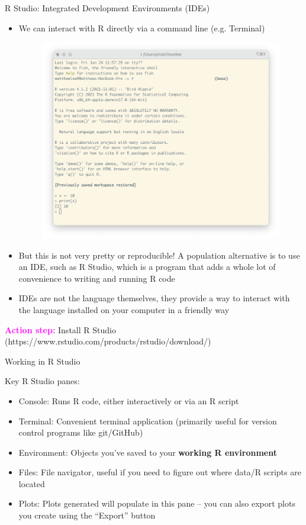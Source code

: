 \documentclass[svgnames,smaller]{beamer}\usepackage[]{graphicx}\usepackage[]{color}
\newcommand{\bmagenta}[1]{\textcolor{magenta}{\textbf{#1}}}
\begin{document}
\begin{frame}{R Studio: Integrated Development Environments (IDEs)}

\begin{itemize}
    \item We can interact with R directly via a command line (e.g. Terminal)
    \begin{figure}[tb]
    \centering
    \includegraphics[width = .35\textwidth]{R-terminal.png}
    \end{figure}
    \item But this is not very pretty or reproducible! A population alternative is to use an IDE, such as R Studio, which is a program that adds a whole lot of convenience to writing and running R code
    \item IDEs are not the language themselves, they provide a way to interact with the language installed on your computer in a friendly way
\end{itemize}

\bmagenta{Action step:} Install R Studio (https://www.rstudio.com/products/rstudio/download/) 


\end{frame}



\begin{frame}{Working in R Studio}

Key R Studio panes:
\begin{itemize}
    \item Console: Runs R code, either interactively or via an R script
    \item Terminal: Convenient terminal application (primarily useful for version control programs like git/GitHub)
    \item Environment: Objects you've saved to your \textbf{working R environment}
    \item Files: File navigator, useful if you need to figure out where data/R scripts are located
    \item Plots: Plots generated will populate in this pane -- you can also export plots you create using the ``Export'' button
\end{itemize}

\end{frame}
\end{document}
